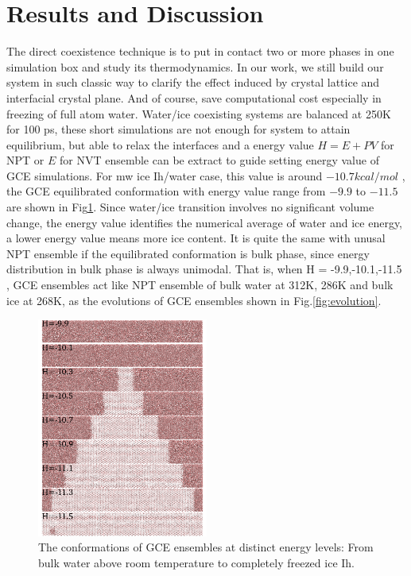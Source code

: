 \documentclass[aps,prl,twocolumn,superscriptaddress]{revtex4-1}
\begin{document}
\section{Results and Discussion} 
The direct coexistence technique is to put in contact two or more phases in one simulation box and study its thermodynamics. In our work, we still build our system in such classic way to clarify the effect induced by crystal lattice and interfacial crystal plane. And of course, save computational cost especially in freezing of full atom water. Water/ice coexisting systems are balanced at 250K for 100 ps, these short simulations are not enough for system to attain equilibrium, but able to relax the interfaces and a energy value $H=E+PV$ for NPT or $E$ for NVT ensemble can be extract to guide setting  energy value of GCE simulations\cite{Xu2012,Xu2015}. For mw ice Ih/water case, this value is around $-10.7 kcal/mol$  ,  the GCE equilibrated conformation with energy value range from $-9.9$ to $-11.5$ are shown in Fig\ref{fig:conformation}. Since water/ice transition involves no significant volume change, the energy value identifies the numerical average of water and ice energy, a lower energy value means more ice content. It is quite the same with unusal NPT ensemble if the equilibrated conformation is bulk phase, since energy distribution in bulk phase is always unimodal. That is, when H = -9.9,-10.1,-11.5 , GCE ensembles act like NPT ensemble of bulk water at 312K, 286K and bulk ice at 268K, as the evolutions of GCE ensembles  shown in Fig.\ref{fig:evolution}.
\begin{figure}[ht]
\centering{}\includegraphics[width=0.5\textwidth]{conf.png} 
\caption{The conformations of GCE ensembles at distinct energy levels: From bulk water above room temperature to completely freezed ice Ih.
\label{fig:conformation} }
\end{figure}
\end{document}
